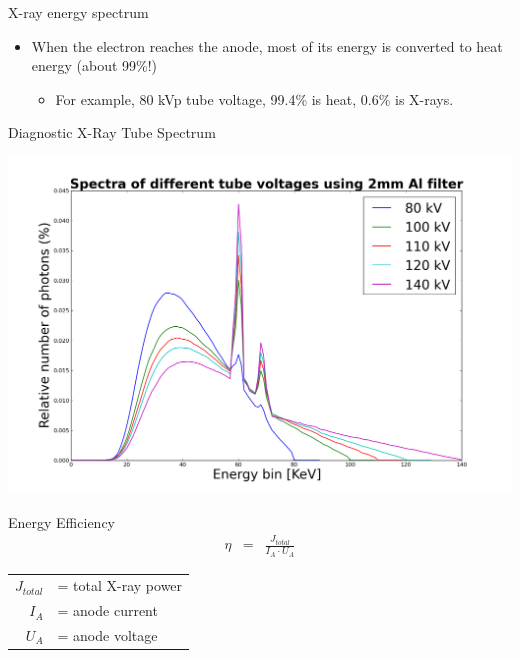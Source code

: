 \begin{frame}{X-ray energy spectrum}
    \begin{itemize}
        \item When the electron reaches the anode, most of its energy is converted to heat energy (about 99\%!)
              \begin{itemize}
                  \item For example, 80 kVp tube voltage, 99.4\% is heat, 0.6\% is X-rays.
              \end{itemize}

    \end{itemize}
\end{frame}

\begin{frame}{Diagnostic X-Ray Tube Spectrum}
    \begin{center}\includegraphics[height=0.8\textheight ]{images/spectrum-diff-voltages}\end{center}
\end{frame}

\begin{frame}[c]{Energy Efficiency}
    \begin{eqnarray*}
        \eta&=&\frac{J_{total}}{I_A \cdot U_A}
    \end{eqnarray*}
    \begin{table}[t]
        \centering
        \begin{tabular}{r l}
            $J_{total}$ & = total X-ray power \\
            $I_A$       & = anode current     \\
            $U_A$       & = anode voltage     \\
        \end{tabular}
    \end{table}
\end{frame}

